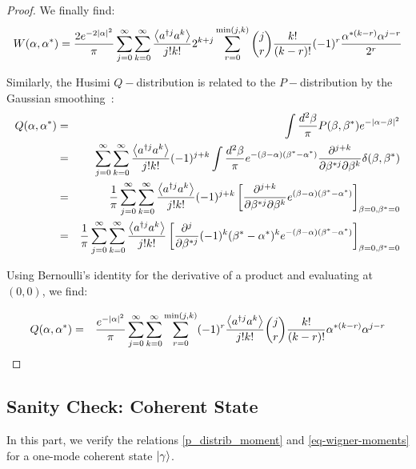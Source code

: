 \begin{proof}
We finally find:
\begin{equation}
    W(\alpha, \alpha^*) = \frac{2 e^{-2 |\alpha|^2}}{\pi} \sum_{j=0}^\infty \sum_{k=0}^\infty \frac{\left\langle a^{\dagger j} a^k \right\rangle}{j! k!} 2^{k+j} \sum_{r = 0}^{\min(j, k)} \binom{j}{r}  \frac{k!}{(k-r)!} (-1)^r \frac{\alpha^{* (k-r)} \alpha^{j-r}}{2^r}
\end{equation}

Similarly, the Husimi $Q-$distribution is related to the $P-$distribution by the Gaussian smoothing~\cite{weiestrass_trans_ref}:
\begin{eqnarray}
    Q(\alpha, \alpha^*) &=& \int \frac{d^2 \beta}{\pi} P(\beta, \beta^*) e^{-|\alpha - \beta|^2}\\
    &=& \sum_{j=0}^\infty \sum_{k=0}^\infty \frac{\left\langle a^{\dagger j} a^k \right\rangle}{j! k!} (-1)^{j+k} \int \frac{d^2 \beta}{\pi} e^{-(\beta - \alpha) (\beta^* - \alpha^*)} \frac{\partial^{j+k}}{\partial \beta^{* j} \partial \beta^k}  \delta(\beta, \beta^*) \nonumber\\
    &=& \frac{1}{\pi} \sum_{j=0}^\infty \sum_{k=0}^\infty \frac{\left\langle a^{\dagger j} a^k \right\rangle}{j! k!} (-1)^{j+k} \left[\frac{\partial^{j+k}}{\partial \beta^{* j} \partial \beta^k} e^{(\beta - \alpha) (\beta^* - \alpha^*)}\right]_{\beta = 0, \beta^* = 0} \nonumber\\
    &=& \frac{1}{\pi} \sum_{j=0}^\infty \sum_{k=0}^\infty \frac{\left\langle a^{\dagger j} a^k \right\rangle}{j! k!} \left[\frac{\partial^{j}}{\partial \beta^{* j}} (-1)^k (\beta^* -\alpha^*)^k e^{-(\beta - \alpha) (\beta^* - \alpha^*)}\right]_{\beta = 0, \beta^* = 0} \nonumber\\
\end{eqnarray}

Using Bernoulli's identity for the derivative of a product and evaluating at $(0, 0)$, we find:

\begin{eqnarray}
     Q(\alpha, \alpha^*) &=& \frac{e^{-|\alpha|^2}}{\pi} \sum_{j=0}^\infty \sum_{k=0}^\infty \sum_{r = 0}^{\min(j, k)} (-1)^r \frac{\left\langle a^{\dagger j} a^k \right\rangle}{j! k!} \binom{j}{r}  \frac{k!}{(k-r)!} \alpha^{* (k-r)} \alpha^{j-r}
\end{eqnarray}
\end{proof}
\subsection{Sanity Check: Coherent State}
In this part, we verify the relations \autoref{p_distrib_moment} and \autoref{eq-wigner-moments} for a one-mode coherent state $\ket{\gamma}$.

